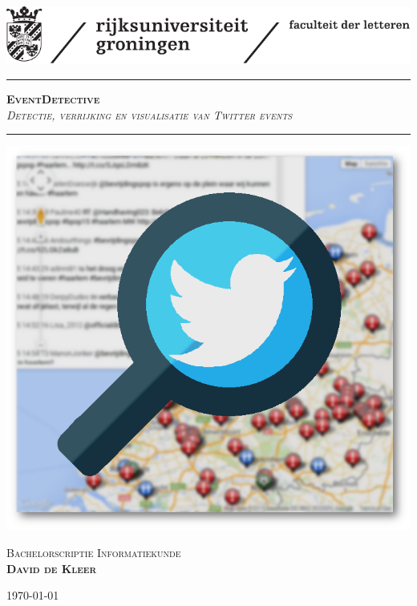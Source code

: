 
\begin{titlepage}
\begin{center}
\setcounter{page}{0}

\vspace*{0.5cm}

\includegraphics[scale=1]{logo.pdf}

\vspace{0.7 cm}

\hrule
\vspace{1 cm}
\Huge{\textbf{\textsc{EventDetective}}}\\
\vspace{0.5 cm}
\Large{\textit{\textsc{Detectie, verrijking en visualisatie van Twitter events}}}

\vspace{1 cm}
\hrule
\vspace{1.3 cm}

\includegraphics[scale=0.45]{mapchartlogo.png}
\vfill

\vspace{0.6 cm}
\LARGE{\textsc{Bachelorscriptie Informatiekunde}}\\
\vspace{1.2 cm}
\Large{\textsc{\textbf{David de Kleer}}}
\vspace{0.2 cm}

\vrule
\hspace{0.2 cm}
\normalsize{\textsc{\today}}
\hspace{0.2 cm}
\vrule
\end{center}
\end{titlepage}
